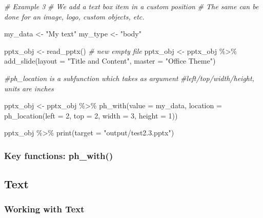 \documentclass[
]{book}
\newenvironment{Shaded}{\begin{snugshade}}{\end{snugshade}}
\newcommand{\AttributeTok}[1]{\textcolor[rgb]{0.77,0.63,0.00}{#1}}
\newcommand{\CommentTok}[1]{\textcolor[rgb]{0.56,0.35,0.01}{\textit{#1}}}
\newcommand{\DecValTok}[1]{\textcolor[rgb]{0.00,0.00,0.81}{#1}}
\newcommand{\FunctionTok}[1]{\textcolor[rgb]{0.00,0.00,0.00}{#1}}
\newcommand{\NormalTok}[1]{#1}
\newcommand{\OtherTok}[1]{\textcolor[rgb]{0.56,0.35,0.01}{#1}}
\newcommand{\SpecialCharTok}[1]{\textcolor[rgb]{0.00,0.00,0.00}{#1}}
\newcommand{\StringTok}[1]{\textcolor[rgb]{0.31,0.60,0.02}{#1}}
\begin{document}
\begin{Shaded}
\begin{Highlighting}[]
\CommentTok{\# Example 3}
\CommentTok{\# We add a text box item in a custom position}
\CommentTok{\# The same can be done for an image, logo, custom objects, etc.}

\NormalTok{my\_data }\OtherTok{\textless{}{-}} \StringTok{"My text"}
\NormalTok{my\_type }\OtherTok{\textless{}{-}} \StringTok{"body"}

\NormalTok{pptx\_obj }\OtherTok{\textless{}{-}} \FunctionTok{read\_pptx}\NormalTok{() }\CommentTok{\# new empty file}
\NormalTok{pptx\_obj }\OtherTok{\textless{}{-}}\NormalTok{ pptx\_obj }\SpecialCharTok{\%\textgreater{}\%}
  \FunctionTok{add\_slide}\NormalTok{(}\AttributeTok{layout =} \StringTok{"Title and Content"}\NormalTok{, }\AttributeTok{master =} \StringTok{"Office Theme"}\NormalTok{)}

\CommentTok{\#ph\_location is a subfunction which takes as argument }
\CommentTok{\#left/top/width/height, units are inches}

\NormalTok{pptx\_obj }\OtherTok{\textless{}{-}}\NormalTok{ pptx\_obj }\SpecialCharTok{\%\textgreater{}\%}
  \FunctionTok{ph\_with}\NormalTok{(}\AttributeTok{value =}\NormalTok{ my\_data, }\AttributeTok{location =} \FunctionTok{ph\_location}\NormalTok{(}\AttributeTok{left =} \DecValTok{2}\NormalTok{, }\AttributeTok{top =} \DecValTok{2}\NormalTok{, }\AttributeTok{width =} \DecValTok{3}\NormalTok{, }\AttributeTok{height =} \DecValTok{1}\NormalTok{))}

\NormalTok{pptx\_obj }\SpecialCharTok{\%\textgreater{}\%}
  \FunctionTok{print}\NormalTok{(}\AttributeTok{target =} \StringTok{"output/test2.3.pptx"}\NormalTok{) }
\end{Highlighting}
\end{Shaded}

\hypertarget{key-functions-ph_with}{%
\subsubsection{Key functions: ph\_with()}\label{key-functions-ph_with}}

\hypertarget{text-1}{%
\subsection{Text}\label{text-1}}

\hypertarget{working-with-text}{%
\subsubsection{Working with Text}\label{working-with-text}}
\end{document}
